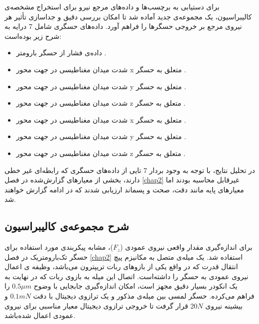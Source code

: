 برای دستیابی به برچسب‌ها و داده‌های مرجع نیرو برای استخراج مشخصه‌ی کالیبراسیون، یک مجموعه‌ی جدید آماده شد تا امکان بررسی دقیق و جداسازی تأثیر هر نیروی مرجع بر خروجی حسگر‌ها را فراهم آورد. داده‌های حسگری شامل 7 درایه به شرح زیر بوده‌است:
\begin{itemize}
	\item داده‌ی فشار از حسگر بارومتر
	.
	\item شدت میدان مغناطیسی در جهت محور 
	x
	 متعلق به حسگر 
	.
	\item شدت میدان مغناطیسی در جهت محور 
	y
	متعلق به حسگر 
	.
	\item شدت میدان مغناطیسی در جهت محور 
	z
	متعلق به حسگر 
	.
	\item شدت میدان مغناطیسی در جهت محور 
	x
	متعلق به حسگر 
	.
	\item شدت میدان مغناطیسی در جهت محور 
	y
	متعلق به حسگر 
	.
	\item شدت میدان مغناطیسی در جهت محور 
	z
	متعلق به حسگر 
	.
\end{itemize}
 در تحلیل نتایج، با توجه به وجود بردار 7 تایی از داده‌های حسگری که رابطه‌ای غیر خطی دارند، بخشی از معیار‌های گزارش‌شده در فصل \ref{chap2} غیرقابل محاسبه بودند اما معیار‌های پایه مانند دقت، صحت و پسماند ارزیابی شدند که در ادامه گزارش خواهند شد. 

\subsection{شرح مجموعه‌ی کالیبراسیون}
برای اندازه‌گیری مقدار واقعی نیروی عمودی ($F_z$)، مشابه پیکربندی مورد استفاده برای حسگر تک‌‌‌بارومتریک در فصل \ref{chap2} استفاده شد. یک میله‌ی متصل به مکانیزم پیچ انتقال قدرت که در واقع یکی از بازو‌های ربات تریپترون 
\cite{arian2018kinematic}
می‌باشد، وظیفه ی اعمال نیروی عمودی به حسگر را داشته‌است. اتصال این میله به بازوی ربات که در نهایت به یک انکودر بسیار دقیق مجهز است، امکان اندازه‌‌گیری جابجایی با وضوح
 $0.5\mu m$
 را فراهم می‌کرده. حسگر لمسی بین میله‌ی مذکور و یک ترازوی دیجیتال با دقت 
 $0.1 mN$ 
 و بیشینه نیروی $20 N$ قرار گرفت تا خروجی ترازوی دیجیتال معیار مناسبی برای نیروی عمودی اعمال شده‌باشد.

